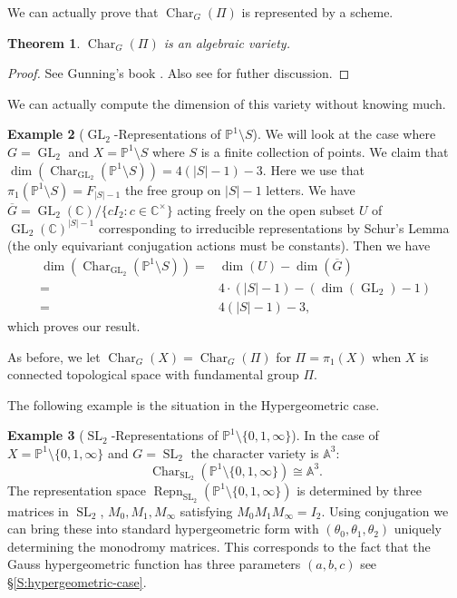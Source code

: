 \documentclass[12pt]{book}
\numberwithin{equation}{section}
\newtheorem{theorem}{Theorem}[subsection]
\theoremstyle{definition}
\newtheorem{example}[theorem]{Example}
\theoremstyle{remark}
\newcommand{\CC}{\mathbb{C}}
\renewcommand{\AA}{\mathbb{A}}
\newcommand{\PP}{\mathbb{P}}
\newcommand{\GL}{\operatorname{GL}}
\newcommand{\SL}{\operatorname{SL}}
\newcommand{\Repn}{\operatorname{Repn}}
\newcommand{\Char}{\operatorname{Char}}
\begin{document}
We can actually prove that $\Char_G(\Pi)$ is represented by a scheme.
\begin{theorem}
	$\Char_G(\Pi)$ is an algebraic variety. 
\end{theorem}
\begin{proof}
	See Gunning's book \cite[Theorem 27]{Gunning1967}.
	Also see \cite[pg 149]{Iwasaki1991} for futher discussion.
\end{proof}

We can actually compute the dimension of this variety without knowing much. 
\begin{example}[$\GL_2$-Representations of $\PP^1\setminus S$]\label{E:rank2-repns}
	We will look at the case where $G= \GL_2$ and $X = \PP^1\setminus S$ where $S$ is a finite collection of points.
	We claim that $\dim(\Char_{\GL_2}(\PP^1\setminus S))=4(\vert S\vert -1)-3$.
	Here we use that $\pi_1(\PP^1\setminus S) = F_{\vert S \vert-1}$ the free group on $\vert S \vert-1$ letters.
	We have $\overline{G}=\GL_2(\CC)/\lbrace c I_2 \colon c\in \CC^{\times}\rbrace$ acting freely on the open subset $U$ of $\GL_2(\CC)^{\vert S \vert -1}$ corresponding to irreducible representations by Schur's Lemma (the only equivariant conjugation actions must be constants).
	Then we have
	\begin{align*}
	\dim( \Char_{\GL_2}(\PP^1\setminus S) )=& \dim(U) - \dim(\overline{G}) \\
	=& 4\cdot (\vert S \vert -1) -(\dim(\GL_2) -1) \\
	=& 4(\vert S \vert-1) -3,
	\end{align*}
	which proves our result.
\end{example}

As before, we let $\Char_G(X)=\Char_G(\Pi)$ for $\Pi=\pi_1(X)$ when $X$ is connected topological space with fundamental group $\Pi$.

The following example is the situation in the Hypergeometric case. 
\begin{example}[$\SL_2$-Representations of $\PP^1\setminus \lbrace 0,1,\infty\rbrace$]
	In the case of $X=\PP^1\setminus \lbrace 0,1,\infty\rbrace$ and $G=\SL_2$ the character variety is $\AA^3$:
	$$ \Char_{\SL_2}(\PP^1\setminus \lbrace 0,1,\infty \rbrace) \cong \AA^3.$$
	The representation space $\Repn_{\SL_2}(\PP^1\setminus \lbrace 0,1,\infty \rbrace)$ is determined by three matrices in $\SL_2$, $M_0,M_1,M_{\infty}$ satisfying $M_0M_1M_{\infty}=I_2$. 
	Using conjugation we can bring these into standard hypergeometric form with $(\theta_0,\theta_1,\theta_2)$ uniquely determining the monodromy matrices. 
	This corresponds to the fact that the Gauss hypergeometric function has three parameters $(a,b,c)$ see \S\ref{S:hypergeometric-case}.
\end{example}
\end{document}

